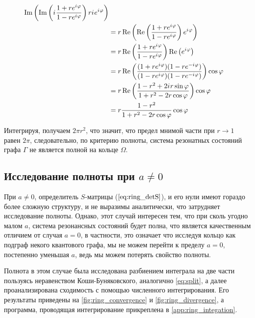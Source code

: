 \begin{align*}
   \operatorname{Im} \left(  \operatorname{Im} \left( {i\mkern1mu} \frac{1 + r e^{{i\mkern1mu} \varphi}}{1 - r e^{{i\mkern1mu} \varphi}} \right) r {i\mkern1mu} e^{{i\mkern1mu} \varphi} \right)
\\ &= r \operatorname{Re} \left(  \operatorname{Re} \left( \frac{1 + r e^{{i\mkern1mu} \varphi}}{1 - r e^{{i\mkern1mu} \varphi}} \right) e^{{i\mkern1mu} \varphi} \right)
\\ &= r \operatorname{Re} \left( \frac{1 + r e^{{i\mkern1mu} \varphi}}{1 - r e^{{i\mkern1mu} \varphi}} \right) \operatorname{Re} \left(   e^{{i\mkern1mu} \varphi} \right)
\\ &= r \operatorname{Re} \left( \frac{(1 + r e^{{i\mkern1mu} \varphi}) (1 - r e^{-{i\mkern1mu} \varphi}) }{(1 - r e^{{i\mkern1mu} \varphi}) (1 - r e^{-{i\mkern1mu} \varphi})} \right) \cos \varphi
\\ &= r \operatorname{Re} \left( \frac{1 - r^2 + 2 {i\mkern1mu} r \sin \varphi}{1 + r^2 - 2 r \cos \varphi} \right) \cos \varphi
\\ &= r \frac{1 - r^2}{1 + r^2 - 2 r \cos \varphi} \cos \varphi 
\end{align*}

Интегрируя, получаем $2 \pi r^2$, что значит, что предел мнимой части при $r \to 1$ равен $2 \pi$, следовательно, по критерию полноты, система резонатных состояний графа $\Gamma$ не является полной на кольце $\Omega$.


\subsection{Исследование полноты при $a \ne 0$}

При $a \ne 0$, определитель $S$-матрицы ($\ref{eq:ring_detS}$), и его нули имеют гораздо более сложную структуру, и не выразимы аналитически, что затрудняет исследование полноты. Однако, этот случай интересен тем, что при сколь угодно малом $a$, система резонансных состояний будет полна, что является качественным отличием от случая $a = 0$, в частности, это означает что исследуя кольцо как подграф некого квантового графа, мы не можем перейти к пределу $a=0$, постепенно уменьшая $a$, ведь мы можем потерять свойство полноты.

Полнота в этом случае была исследована разбиением интеграла на две части пользуясь неравенством Коши-Буняковского, аналогично \ref{eq:split}, а далее проанализирована сходимость с помощью численного интегрирования. Его результаты приведены на \autoref{fig:ring_convergence} и \autoref{fig:ring_divergence}, а программа, проводящая интегрирование прикреплена в \autoref{app:ring_integation}.


